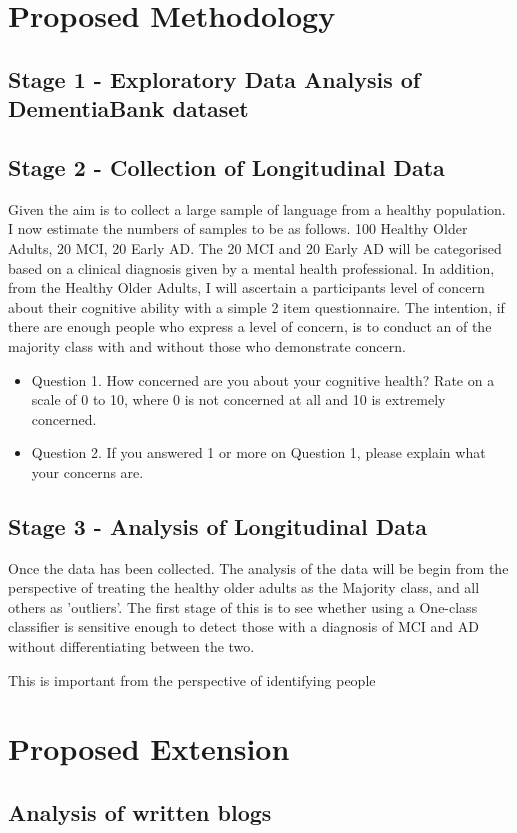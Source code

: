 \documentclass[11pt]{article}
\begin{document}
\section{Proposed Methodology}
\subsection{Stage 1 - Exploratory Data Analysis of DementiaBank dataset}



\subsection{Stage 2 - Collection of Longitudinal Data}
Given the aim is to collect a large sample of language from a healthy population. I now estimate the numbers of samples to be as follows. 100 Healthy Older Adults, 20 MCI, 20 Early AD. The 20 MCI and 20 Early AD will be categorised based on a clinical diagnosis given by a mental health professional. In addition, from the Healthy Older Adults, I will ascertain a participants level of concern about their cognitive ability with a simple 2 item questionnaire. The intention, if there are enough people who express a level of concern, is to conduct an of the majority class with and without those who demonstrate concern.
\par 
\begin{itemize}
	\item Question 1. How concerned are you about your cognitive health? Rate on a scale of 0 to 10, where 0 is not concerned at all and 10 is extremely concerned.
	\item Question 2. If you answered 1 or more on Question 1, please explain what your concerns are.
\end{itemize}
\par 

\subsection{Stage 3 - Analysis of Longitudinal Data}
Once the data has been collected. The analysis of the data will be begin from the perspective of treating the healthy older adults as the Majority class, and all others as 'outliers'. The first stage of this is to see whether using a One-class classifier is sensitive enough to detect those with a diagnosis of MCI and AD without differentiating between the two. 

This is important from the perspective of identifying people 


\section{Proposed Extension}
\subsection{Analysis of written blogs}
\end{document}
